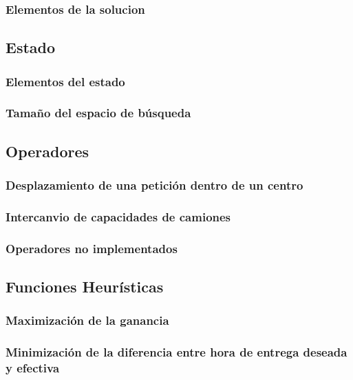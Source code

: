 \documentclass{article}
\begin{document}
\subsubsection{Elementos de la solucion}

\subsection{Estado}
\subsubsection{Elementos del estado}
\subsubsection{Tamaño del espacio de búsqueda}


\subsection{Operadores}
\subsubsection{Desplazamiento de una petición dentro de un centro}
\subsubsection{Intercanvio de capacidades de camiones}
\subsubsection{Operadores no implementados}


\subsection{Funciones Heurísticas}
\subsubsection{Maximización de la ganancia}
\subsubsection{Minimización de la diferencia entre hora de entrega deseada y
efectiva}
\end{document}

